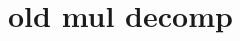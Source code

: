 \documentclass[letterpaper,11pt]{article}
\newcommand{\vset}{\calV}
\newcommand{\vsetp}[2]{\vset(#1,#2)}
\newcommand{\ustat}{\mathbb{U}}
\newcommand{\vstat}{\mathbb{V}}
\newcommand{\partition}{\mathrm{Partition}}
\newcommand{\partitionp}[1]{\partition(#1)}
\begin{document}




\section{old mul decomp}
\end{document}
